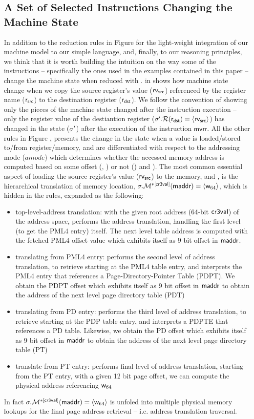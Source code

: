 \subsection{A Set of Selected Instructions Changing the Machine State}
\label{sec:selectedinstrsemantics}
In addition to the reduction rules in Figure  for the light-weight integration of our machine model to our simple language, and, finally, to our reasoning principles, we think that it is worth building the intuition on the way some of the instructions -- specifically the ones used in the examples contained in this paper -- change the machine state when reduced with .  in  shows how machine state change when we copy the source register's value ($\mathsf{rv}_{\textsf{src}}$) referenced by the register name ($\mathsf{r}_{\textsf{src}}$) to the destination register ($\mathsf{r}_{\textsf{dst}}$). We follow the convention of showing only the pieces of the machine state changed after the instruction execution -- only the register value of the destiantion register ($ \sigma'.\mathcal{R}(\mathsf{r}_{\textsf{dst}})=\langle\mathsf{rv}_{\textsf{src}}\rangle$) has changed in the state ($\sigma'$) after the execution of the instruction $\textsf{mvrr}$. All the other rules in Figure , presents the change in the state when a value is loaded/stored to/from register/memory, and are differentiated with respect to the addressing mode ($amode$) which determines whether the accessed memory address is computed based on some offset (, ) or not () and ). The most common essential aspect of loading the source register's value ($\mathsf{rv}_{\textsf{src}}$) to the memory,  and , is the hierarchical translation of memory location, $\sigma.\mathcal{M}^{*[\mathsf{cr3val}]}(\mathsf{maddr})=\langle\mathsf{w}_{64}\rangle$, which is hidden in the rules, expanded as the following:
\begin{itemize}
\item top-level-address translation: with the given root address (64-bit $\mathsf{cr3val}$) of the address space, performs the address translation, handling the first level (to get the PML4 entry) itself. The next level table address is computed with the fetched PML4 offset value which exhibits itself as 9-bit offset in $\mathsf{maddr}$.
\item translating from PML4 entry: performs the second level of address translation, to retrieve starting at the PML4 table entry, and interprets the PML4 entry that references a Page-Directory-Pointer Table (PDPT). We obtain the PDPT offset which exhibits itself as 9 bit offset in $\mathsf{maddr}$ to obtain the address of the next level page directory table (PDT)
\item translating from PD entry: performs the third level of address translation, to retrieve starting at the PDP table entry, and interprets a PDPTE that references a PD table. Likewise, we obtain the PD offset which exhibits itself as 9 bit offset in $\mathsf{maddr}$ to obtain the address of the next level page directory table (PT)
\item translate from PT entry: performs final level of address translation, starting from the PT entry, with a given 12 bit page offset, we can compute the physical address referencing $\mathsf{w}_{64}$
\end{itemize}
In fact $\sigma.\mathcal{M}^{*[\mathsf{cr3val}]}(\mathsf{maddr})=\langle\mathsf{w}_{64}\rangle$ is unfoled into multiple physical memory lookups for the final page address retrieval -- i.e. address translation traversal. 

